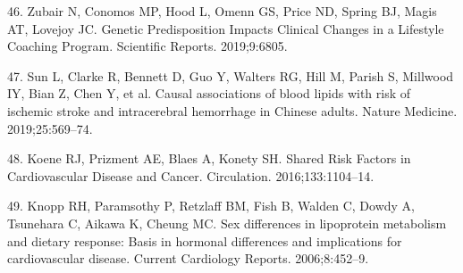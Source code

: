 \documentclass[]{article}
\begin{document}
\leavevmode\hypertarget{ref-Zubair2019}{}%
46. Zubair N, Conomos MP, Hood L, Omenn GS, Price ND, Spring BJ, Magis
AT, Lovejoy JC. Genetic Predisposition Impacts Clinical Changes in a
Lifestyle Coaching Program. Scientific Reports. 2019;9:6805.

\leavevmode\hypertarget{ref-Sun2019a}{}%
47. Sun L, Clarke R, Bennett D, Guo Y, Walters RG, Hill M, Parish S,
Millwood IY, Bian Z, Chen Y, et al. Causal associations of blood lipids
with risk of ischemic stroke and intracerebral hemorrhage in Chinese
adults. Nature Medicine. 2019;25:569--74.

\leavevmode\hypertarget{ref-Koene2016}{}%
48. Koene RJ, Prizment AE, Blaes A, Konety SH. Shared Risk Factors in
Cardiovascular Disease and Cancer. Circulation. 2016;133:1104--14.

\leavevmode\hypertarget{ref-Knopp2006}{}%
49. Knopp RH, Paramsothy P, Retzlaff BM, Fish B, Walden C, Dowdy A,
Tsunehara C, Aikawa K, Cheung MC. Sex differences in lipoprotein
metabolism and dietary response: Basis in hormonal differences and
implications for cardiovascular disease. Current Cardiology Reports.
2006;8:452--9.
\end{document}
